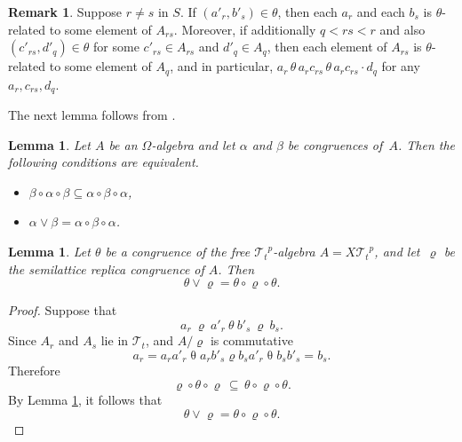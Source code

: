 \documentclass{birkau}
\def\Om{\Omega}
\newcommand{\mcT}{\mathcal{T}}
\newcommand{\pro}[1]{{#1}^p}
\theoremstyle{plain}
\newtheorem{lemma}[theorem]{Lemma}
\theoremstyle{definition}
\newtheorem{remark}[theorem]{Remark}
\numberwithin{equation}{section}
\begin{document}
\begin{remark}\label{R:congrfree}
Suppose $r\neq s$ in $S$. If $(a'_r, b'_s) \in \theta$, then each $a_r$ and each $b_s$ is
$\theta$-related to some element of $A_{rs}$. Moreover, if additionally $q < rs < r$ and
also $(c'_{rs}, d'_q) \in \theta$ for some $c'_{rs} \in A_{rs}$ and $d'_q \in A_q$, then
each element of $A_{rs}$ is $\theta$-related to some element of $A_q$, and in particular,
$a_r \, \theta \, a_r c_{rs} \, \theta \, a_r c_{rs} \cdot d_q$ for any $a_r, c_{rs},
d_q$.
\end{remark}

The next lemma follows from \cite[Lemma~4.66]{MMT87}.

\begin{lemma}\label{L:3-perm}
Let $A$ be an $\Om$-algebra and let $\alpha$ and $\beta$ be congruences of~$A$. Then the
following conditions are equivalent.
\begin{itemize}
\item[(a)] $\beta \circ \alpha \circ \beta \subseteq \alpha \circ \beta  \circ \alpha$,
\item[(b)] $\alpha \vee \beta = \alpha \circ \beta  \circ \alpha$.
\end{itemize}
\end{lemma}


\begin{lemma}\label{L:3permrt}
  Let $\theta$ be a congruence of the free $\pro{\mcT_t}$-algebra $A = X\pro{\mcT_t}$, and
  let~$\varrho$ be the semilattice replica congruence of $A$. Then
\begin{equation}
\theta \vee \varrho = \theta \circ \varrho \circ \theta.
\end{equation}
\end{lemma}

\begin{proof}
  Suppose that
  \begin{equation*}
a_r \ \varrho \ a'_r \ \theta \ b'_s \ \varrho \ b_s.
\end{equation*}
Since $A_r$ and $A_s$ lie in $\mcT_t$, and $A/\varrho$ is commutative
\begin{equation*}
a_r = a_ra'_r \mathrel{\theta} a_r b'_s \mathrel{\varrho} b_s a'_r
\mathrel{\theta}  b_sb'_s = b_s.
\end{equation*}
Therefore
\begin{equation*}
\varrho \circ \theta \circ \varrho \, \subseteq \, \theta \circ \varrho \circ\theta.
\end{equation*}
By Lemma \ref{L:3-perm}, it follows that
\begin{equation*}
\theta \vee \varrho  = \theta \circ \varrho \circ\theta.
\end{equation*}
\end{proof}
\end{document}
